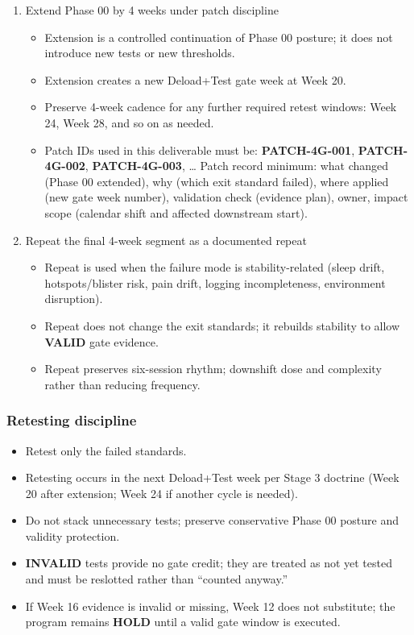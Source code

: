 \documentclass[10pt]{article}
\begin{document}
\begin{enumerate}
\item Extend Phase 00 by 4 weeks under patch discipline
\begin{itemize}
\item Extension is a controlled continuation of Phase 00 posture; it does not introduce new tests or new thresholds.
\item Extension creates a new Deload+Test gate week at Week 20.
\item Preserve 4-week cadence for any further required retest windows: Week 24, Week 28, and so on as needed.
\item Patch IDs used in this deliverable must be: \textbf{PATCH-4G-001}, \textbf{PATCH-4G-002}, \textbf{PATCH-4G-003}, …\newline
      Patch record minimum: what changed (Phase 00 extended), why (which exit standard failed), where applied (new gate week number), validation check (evidence plan), owner, impact scope (calendar shift and affected downstream start).
\end{itemize}

\item Repeat the final 4-week segment as a documented repeat
\begin{itemize}
\item Repeat is used when the failure mode is stability-related (sleep drift, hotspots/blister risk, pain drift, logging incompleteness, environment disruption).
\item Repeat does not change the exit standards; it rebuilds stability to allow \textbf{VALID} gate evidence.
\item Repeat preserves six-session rhythm; downshift dose and complexity rather than reducing frequency.
\end{itemize}
\end{enumerate}

\subsubsection*{Retesting discipline}

\begin{itemize}
\item Retest only the failed standards.
\item Retesting occurs in the next Deload+Test week per Stage 3 doctrine (Week 20 after extension; Week 24 if another cycle is needed).
\item Do not stack unnecessary tests; preserve conservative Phase 00 posture and validity protection.
\item \textbf{INVALID} tests provide no gate credit; they are treated as not yet tested and must be reslotted rather than “counted anyway.”
\item If Week 16 evidence is invalid or missing, Week 12 does not substitute; the program remains \textbf{HOLD} until a valid gate window is executed.
\end{itemize}
\end{document}
